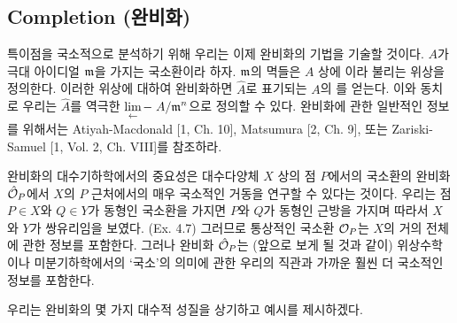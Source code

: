 	
	
	\subsection*{Completion (완비화)}
	특이점을 국소적으로 분석하기 위해 우리는 이제 완비화의 기법을 기술할 것이다.
	$A$가 극대 아이디얼 $\mathfrak{m}$을 가지는 국소환이라 하자.
	$\mathfrak{m}$의 멱들은 $A$ 상에 이라 불리는 위상을 정의한다.
	이러한 위상에 대하여 완비화하면 $\hat A$로 표기되는 $A$의 를 얻는다.
	이와 동치로 우리는 $\hat A$를 역극한 $\displaystyle\lim_\longleftarrow A/\mathfrak{m}^n$으로 정의할 수 있다.
	완비화에 관한 일반적인 정보를 위해서는
	Atiyah-Macdonald [1, Ch. 10], Matsumura [2, Ch. 9], 또는 Zariski-Samuel [1, Vol. 2, Ch. VIII]를 참조하라.
	
	완비화의 대수기하학에서의 중요성은 대수다양체 $X$ 상의 점 $P$에서의 국소환의 완비화 $\hat{\mathcal{O}}_{P}$에서
	$X$의 $P$ 근처에서의 매우 국소적인 거동을 연구할 수 있다는 것이다.
	우리는 점 $P\in X$와 $Q\in Y$가 동형인 국소환을 가지면 $P$와 $Q$가 동형인 근방을 가지며 따라서 $X$와 $Y$가 쌍유리임을 보였다.
	(Ex. 4.7) 그러므로 통상적인 국소환 $\mathcal{O}_P$는 $X$의 거의 전체에 관한 정보를 포함한다.
	그러나 완비화 $\hat{\mathcal{O}}_{P}$는 (앞으로 보게 될 것과 같이) 위상수학이나 미분기하학에서의 `국소'의 의미에 관한
	우리의 직관과 가까운 훨씬 더 국소적인 정보를 포함한다.
	
	우리는 완비화의 몇 가지 대수적 성질을 상기하고 예시를 제시하겠다.
	
	
	\begin{theorema}
	\end{theorema}
	
